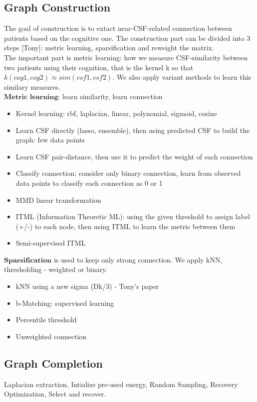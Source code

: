 \documentclass{article}
\theoremstyle{definition}
\begin{document}
\subsection{Graph Construction}
The goal of construction is to extact near-CSF-related connection between patients based on the cognitive one. 
The construction part can be divided into 3 steps [Tony]: metric learning, sparsification and reweight the matrix. \\
The important part is metric learning: how we measure CSF-similarity between two patients using their cognition, that is the kernel k so that $k(cog1, cog2) \approx sim(csf1, csf2)$. We also apply variant methods to learn this similary measures.\\
$\textbf{Metric learning}$: learn similarity, learn connection
\begin{itemize}
	\item Kernel learning: rbf, laplacian, linear, polynomial, sigmoid, cosine
	\item Learn CSF directly (lasso, ensemble), then using predicted CSF to build the graph: few data points
	\item Learn CSF pair-distance, then use it to predict the weight of each connection
	\item Classify connection: consider only binary connection, learn from observed data points to classify each connection as 0 or 1
	\item MMD linear transformation 
	\item ITML (Information Theoretic ML): using the given threshold to assign label (+/-) to each node, then using ITML to learn the metric between them 
	\item Semi-supervised ITML
\end{itemize}

$\textbf{Sparsification}$ is used to keep only strong connection. We apply kNN, thresholding - weighted or binary.
\begin{itemize}
	\item kNN using a new sigma (Dk/3) - Tony's paper
	\item b-Matching: supervised learning
	\item Percentile threshold
	\item Unweighted connection
\end{itemize}

\subsection{Graph Completion} 
Laplacian extraction, Intialize pre-used energy, Random Sampling, Recovery Optimization, Select and recover.
\end{document}
